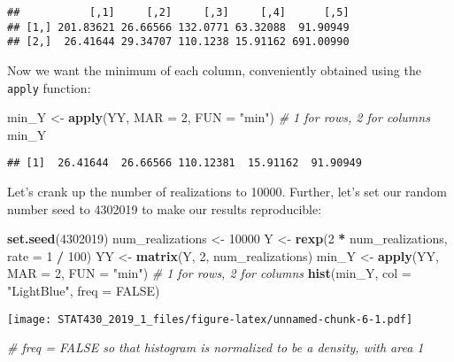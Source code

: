 \documentclass[]{article}
\newenvironment{Shaded}{\begin{snugshade}}{\end{snugshade}}
\newcommand{\KeywordTok}[1]{\textcolor[rgb]{0.13,0.29,0.53}{\textbf{#1}}}
\newcommand{\DataTypeTok}[1]{\textcolor[rgb]{0.13,0.29,0.53}{#1}}
\newcommand{\DecValTok}[1]{\textcolor[rgb]{0.00,0.00,0.81}{#1}}
\newcommand{\StringTok}[1]{\textcolor[rgb]{0.31,0.60,0.02}{#1}}
\newcommand{\CommentTok}[1]{\textcolor[rgb]{0.56,0.35,0.01}{\textit{#1}}}
\newcommand{\OtherTok}[1]{\textcolor[rgb]{0.56,0.35,0.01}{#1}}
\newcommand{\OperatorTok}[1]{\textcolor[rgb]{0.81,0.36,0.00}{\textbf{#1}}}
\newcommand{\NormalTok}[1]{#1}
\begin{document}
\begin{verbatim}
##           [,1]     [,2]     [,3]     [,4]      [,5]
## [1,] 201.83621 26.66566 132.0771 63.32088  91.90949
## [2,]  26.41644 29.34707 110.1238 15.91162 691.00990
\end{verbatim}

Now we want the minimum of each column, conveniently obtained using the
\texttt{apply} function:

\begin{Shaded}
\begin{Highlighting}[]
\NormalTok{min_Y <-}\StringTok{ }\KeywordTok{apply}\NormalTok{(YY, }\DataTypeTok{MAR =} \DecValTok{2}\NormalTok{, }\DataTypeTok{FUN =} \StringTok{"min"}\NormalTok{) }\CommentTok{# 1 for rows, 2 for columns}
\NormalTok{min_Y}
\end{Highlighting}
\end{Shaded}

\begin{verbatim}
## [1]  26.41644  26.66566 110.12381  15.91162  91.90949
\end{verbatim}

Let's crank up the number of realizations to 10000. Further, let's set
our random number seed to 4302019 to make our results reproducible:

\begin{Shaded}
\begin{Highlighting}[]
\KeywordTok{set.seed}\NormalTok{(}\DecValTok{4302019}\NormalTok{)}
\NormalTok{num_realizations <-}\StringTok{ }\DecValTok{10000}
\NormalTok{Y <-}\StringTok{ }\KeywordTok{rexp}\NormalTok{(}\DecValTok{2} \OperatorTok{*}\StringTok{ }\NormalTok{num_realizations, }\DataTypeTok{rate =} \DecValTok{1} \OperatorTok{/}\StringTok{ }\DecValTok{100}\NormalTok{)}
\NormalTok{YY <-}\StringTok{ }\KeywordTok{matrix}\NormalTok{(Y, }\DecValTok{2}\NormalTok{, num_realizations)}
\NormalTok{min_Y <-}\StringTok{ }\KeywordTok{apply}\NormalTok{(YY, }\DataTypeTok{MAR =} \DecValTok{2}\NormalTok{, }\DataTypeTok{FUN =} \StringTok{"min"}\NormalTok{) }\CommentTok{# 1 for rows, 2 for columns}
\KeywordTok{hist}\NormalTok{(min_Y, }\DataTypeTok{col =} \StringTok{"LightBlue"}\NormalTok{, }\DataTypeTok{freq =} \OtherTok{FALSE}\NormalTok{) }
\end{Highlighting}
\end{Shaded}

\texttt{[image: STAT430\_2019\_1\_files/figure-latex/unnamed-chunk-6-1.pdf]}

\begin{Shaded}
\begin{Highlighting}[]
\CommentTok{# freq = FALSE so that histogram is normalized to be a density, with area 1}
\end{Highlighting}
\end{Shaded}
\end{document}
